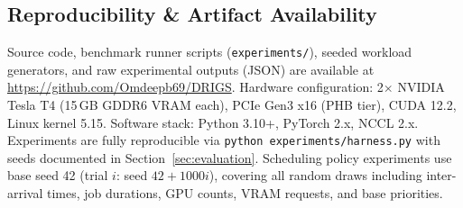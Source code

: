 \subsection*{Reproducibility \& Artifact Availability}
Source code, benchmark runner scripts (\texttt{experiments/}), seeded workload generators, and raw experimental outputs (JSON) are available at \url{https://github.com/Omdeepb69/DRIGS}. Hardware configuration: 2$\times$ NVIDIA Tesla T4 (15\,GB GDDR6 VRAM each), PCIe Gen3 x16 (PHB tier), CUDA 12.2, Linux kernel 5.15. Software stack: Python 3.10+, PyTorch 2.x, NCCL 2.x. Experiments are fully reproducible via \texttt{python experiments/harness.py} with seeds documented in Section~\ref{sec:evaluation}. Scheduling policy experiments use base seed 42 (trial $i$: seed $42 + 1000i$), covering all random draws including inter-arrival times, job durations, GPU counts, VRAM requests, and base priorities.

